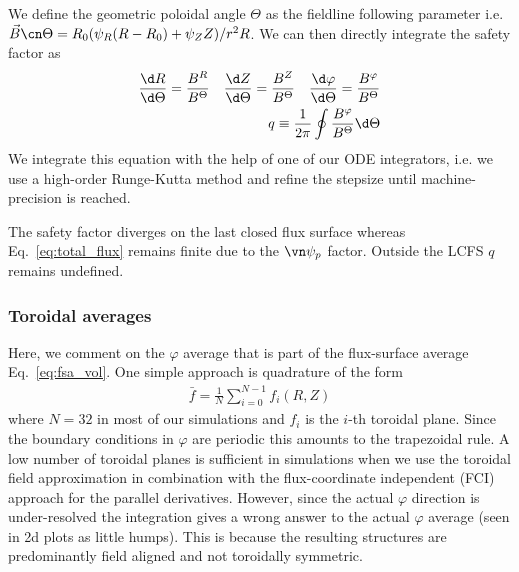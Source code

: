 We define the geometric poloidal angle $\Theta$ as the fieldline following
parameter i.e. $\vec B\cn\Theta = R_0(\psi_R (R-R_0) + \psi_Z Z)/r^2R$.
We can then directly integrate the safety factor as
\begin{align}\label{eq:safety_factor}
\frac{\d R}{\d\Theta} = \frac{B^R}{B^\Theta}\quad
\frac{\d Z}{\d\Theta} = \frac{B^Z}{B^\Theta}\quad
\frac{\d \varphi}{\d\Theta} = \frac{B^\varphi}{B^\Theta}\\
q\equiv\frac{1}{2\pi}\oint \frac{B^\varphi}{B^\Theta} \d\Theta
\end{align}
We integrate this equation with the help of one of our ODE integrators, i.e. we use a high-order Runge-Kutta method
and refine the stepsize until machine-precision is reached.
\begin{tcolorbox}[title=Note]
The safety factor diverges on the last closed flux
surface whereas Eq.~\eqref{eq:total_flux}
remains finite due to the $\vn\psi_p$ factor. Outside the LCFS $q$ remains undefined.
\end{tcolorbox}
\subsubsection{Toroidal averages}
Here, we comment on the $\varphi$ average that is part of the flux-surface average Eq.~\eqref{eq:fsa_vol}.
One simple approach is
quadrature of the form
\begin{align}\label{eq:toroidal_summation}
    \bar f = \frac{1}{N} \sum_{i=0}^{N-1} f_i (R,Z)
\end{align}
where $N=32$ in most of our simulations and $f_i$ is the $i$-th toroidal plane.
Since the boundary conditions in $\varphi$ are periodic this amounts to the trapezoidal rule.
A low number of toroidal planes is sufficient in simulations when we use the toroidal field
approximation in combination with the
flux-coordinate independent (FCI) approach for the parallel derivatives.
However, since the actual $\varphi$ direction is
under-resolved the
integration gives a wrong answer to the actual $\varphi$ average (seen in 2d plots as little humps).
This is because the resulting structures are predominantly field aligned and not toroidally symmetric.

